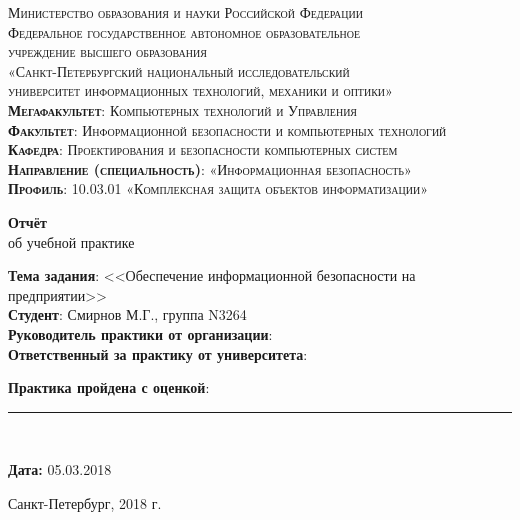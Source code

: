 \begin{titlepage}
	\begin{center}
		\textsc{
			\fontsize{12pt}{14pt}\selectfont
			Министерство образования и науки Российской Федерации\\
			Федеральное государственное автономное образовательное\\
			учреждение высшего образования\\
			«Санкт-Петербургский национальный исследовательский\\
			университет информационных технологий, механики и оптики»\\
			\textbf{Мегафакультет}:  Компьютерных технологий и Управления\\
			\textbf{Факультет}: Информационной безопасности и компьютерных технологий\\
			\textbf{Кафедра}: Проектирования и безопасности компьютерных систем\\
			\textbf{Направление (специальность)}: «Информационная безопасность»\\
			\textbf{Профиль}: 10.03.01 «Комплексная защита объектов информатизации»}
		
		\vfill
		
		\textbf{Отчёт}\\
		об учебной практике\\
	\end{center}

	\begin{flushleft}
	\textbf{Тема задания}: <<Обеспечение информационной безопасности на предприятии>>\\
	\textbf{Студент}: Смирнов М.Г., группа N3264\\
	\textbf{Руководитель практики от организации}:\\
	\textbf{Ответственный за практику от университета}:\\
	\end{flushleft}

	
	\hfill
	\begin{flushright}
	\textbf{Практика пройдена с оценкой}: \rule{10em}{.1pt}\\
	\vfill
	

	\textbf{Дата:} 05.03.2018 
	\end{flushright}
	\vfill
	\begin{center}
		Санкт-Петербург, 2018 г.
	\end{center}
\end{titlepage}

